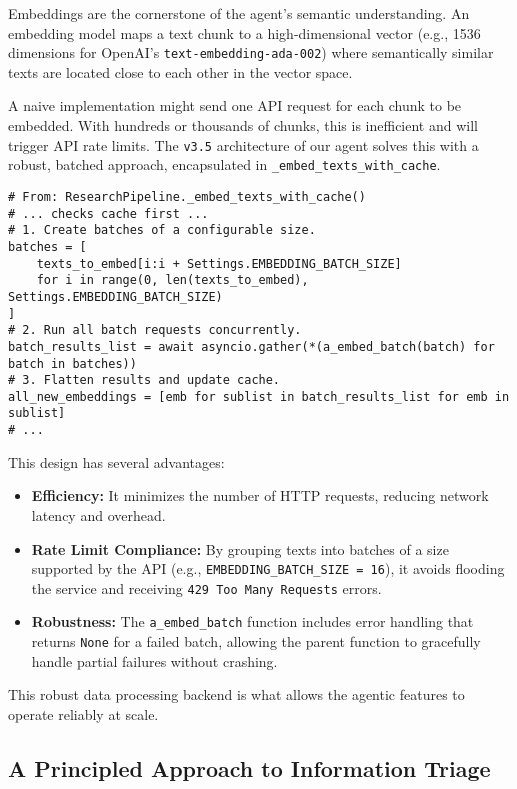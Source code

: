 \documentclass[12pt, a4paper]{article}
\begin{document}
Embeddings are the cornerstone of the agent's semantic understanding. An embedding model maps a text chunk to a high-dimensional vector (e.g., 1536 dimensions for OpenAI's \verb|text-embedding-ada-002|) where semantically similar texts are located close to each other in the vector space.

A naive implementation might send one API request for each chunk to be embedded. With hundreds or thousands of chunks, this is inefficient and will trigger API rate limits. The \verb|v3.5| architecture of our agent solves this with a robust, batched approach, encapsulated in \verb|_embed_texts_with_cache|.

\begin{lstlisting}[style=myPython]
# From: ResearchPipeline._embed_texts_with_cache()
# ... checks cache first ...
# 1. Create batches of a configurable size.
batches = [
    texts_to_embed[i:i + Settings.EMBEDDING_BATCH_SIZE]
    for i in range(0, len(texts_to_embed), Settings.EMBEDDING_BATCH_SIZE)
]
# 2. Run all batch requests concurrently.
batch_results_list = await asyncio.gather(*(a_embed_batch(batch) for batch in batches))
# 3. Flatten results and update cache.
all_new_embeddings = [emb for sublist in batch_results_list for emb in sublist]
# ...
\end{lstlisting}

This design has several advantages:
\begin{itemize}
    \item \textbf{Efficiency:} It minimizes the number of HTTP requests, reducing network latency and overhead.
    \item \textbf{Rate Limit Compliance:} By grouping texts into batches of a size supported by the API (e.g., \verb|EMBEDDING_BATCH_SIZE = 16|), it avoids flooding the service and receiving \verb|429 Too Many Requests| errors.
    \item \textbf{Robustness:} The \verb|a_embed_batch| function includes error handling that returns \verb|None| for a failed batch, allowing the parent function to gracefully handle partial failures without crashing.
\end{itemize}

This robust data processing backend is what allows the agentic features to operate reliably at scale.

\subsection{A Principled Approach to Information Triage}
\end{document}
